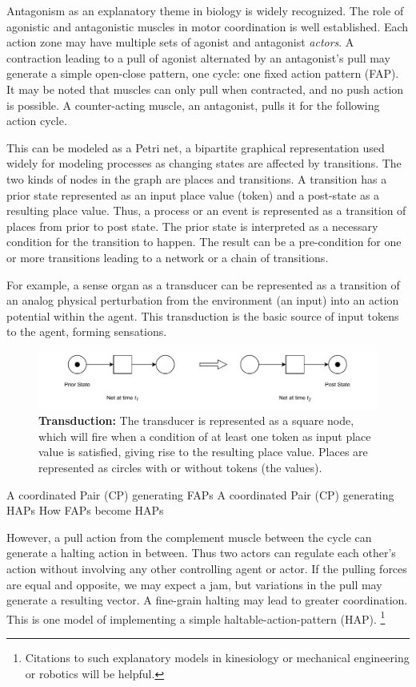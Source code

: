 Antagonism as an explanatory theme in biology is widely recognized. The role of agonistic and antagonistic muscles in motor coordination is well established. Each action zone may have multiple sets of agonist and antagonist \textit{actors}.  A contraction leading to a pull of agonist alternated by an antagonist's pull may generate a simple open-close pattern, one cycle: one fixed action pattern (FAP). It may be noted that muscles can only pull when contracted, and no push action is possible. A counter-acting muscle, an antagonist, pulls it for the following action cycle. 

This can be modeled as a Petri net, a bipartite graphical representation used widely for modeling processes as changing states are affected by transitions. The two kinds of nodes in the graph are places and transitions. A transition has a prior state represented as an input place value (token) and a post-state as a resulting place value. Thus, a process or an event is represented as a transition of places from prior to post state. The prior state is interpreted as a necessary condition for the transition to happen. The result can be a pre-condition for one or more transitions leading to a network or a chain of transitions.

For example, a sense organ as a transducer can be represented as a transition of an analog physical perturbation from the environment (an input) into an action potential within the agent. This transduction is the basic source of input tokens to the agent, forming sensations.
\begin{figure}[ht] 
\includegraphics[width=\textwidth]{graphics/PN_Transduction.pdf}
\caption{\textbf{Transduction:
}The transducer is represented as a square node, which will fire when a condition of at least one token as input place value is satisfied, giving rise to the resulting place value.
Places are represented as circles with or without tokens (the values).}
\label{transduction} 
\end{figure}


A coordinated Pair (CP) generating FAPs
A coordinated Pair (CP) generating HAPs
How FAPs become HAPs



However, a pull action from the complement muscle between the cycle can generate a halting action in between.  Thus two actors can regulate each other's action without involving any other controlling agent or actor. If the pulling forces are equal and opposite, we may expect a jam, but variations in the pull may generate a resulting vector. A fine-grain halting may lead to greater coordination.  This is one model of implementing a simple haltable-action-pattern (HAP). \footnote{Citations to such explanatory models in kinesiology or mechanical engineering or robotics will be helpful.} 

